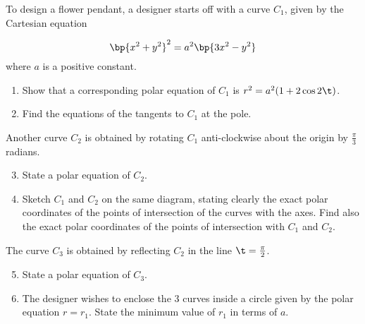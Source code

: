 \begin{problem}
    To design a flower pendant, a designer starts off with a curve $C_1$, given by the Cartesian equation

    \[
        \bp{x^2+y^2}^2 = a^2\bp{3x^2-y^2}
    \]
    where $a$ is a positive constant.

    \begin{enumerate}
        \item Show that a corresponding polar equation of $C_1$ is $r^2 = a^2(1 + 2\cos 2\t)$.
        \item Find the equations of the tangents to $C_1$ at the pole.
    \end{enumerate}

     Another curve $C_2$ is obtained by rotating $C_1$ anti-clockwise about the origin by $\frac\pi3$ radians.

    \begin{enumerate}
        \setcounter{enumi}{2}
        \item State a polar equation of $C_2$.
        \item Sketch $C_1$ and $C_2$ on the same diagram, stating clearly the exact polar coordinates of the points of intersection of the curves with the axes. Find also the exact polar coordinates of the points of intersection with $C_1$ and $C_2$.
    \end{enumerate}

     The curve $C_3$ is obtained by reflecting $C_2$ in the line $\t = \frac\pi2$.

    \begin{enumerate}
        \setcounter{enumi}{4}
        \item State a polar equation of $C_3$.
        \item The designer wishes to enclose the 3 curves inside a circle given by the polar equation $r = r_1$. State the minimum value of $r_1$ in terms of $a$.
    \end{enumerate}
\end{problem}
